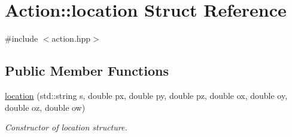\hypertarget{structAction_1_1location}{\section{Action\-:\-:location Struct Reference}
\label{structAction_1_1location}
}


{\ttfamily \#include $<$action.\-hpp$>$}

\subsection*{Public Member Functions}
\begin{DoxyCompactItemize}
\item 
\hyperlink{structAction_1_1location_ad17d992bf98569f4089f57b1c31aa07d}{location} (std\-::string s, double px, double py, double pz, double ox, double oy, double oz, double ow)
\begin{DoxyCompactList}\small\item\em Constructor of location structure. \end{DoxyCompactList}\end{DoxyCompactItemize}
